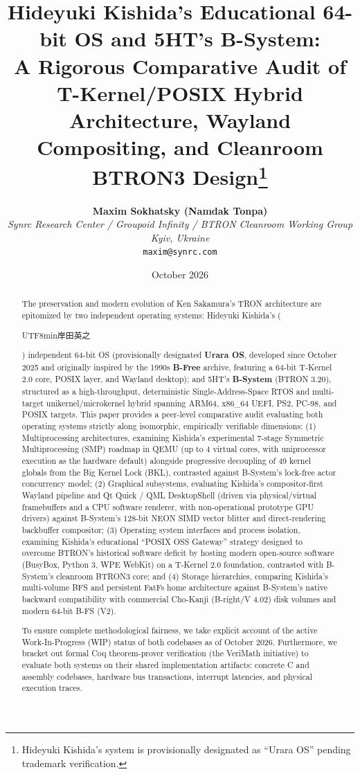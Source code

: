 \documentclass[10pt,journal,compsoc,twocolumn]{article}
\title{\LARGE \textbf{Hideyuki Kishida's Educational 64-bit OS and 5HT's B-System:\\A Rigorous Comparative Audit of T-Kernel/POSIX Hybrid Architecture, Wayland Compositing, and Cleanroom BTRON3 Design}\thanks{Hideyuki Kishida's system is provisionally designated as ``Urara OS'' pending trademark verification.}}
\author{
    \textbf{Maxim Sokhatsky (Namdak Tonpa)}\\[0.3em]
    \small \textit{Synrc Research Center / Groupoid Infinity / BTRON Cleanroom Working Group}\\
    \small \textit{Kyiv, Ukraine}\\
    \small \texttt{maxim@synrc.com}
}
\date{October 2026}
\newcommand{\ja}[1]{\begin{CJK*}{UTF8}{min}#1\end{CJK*}}
\begin{document}
\maketitle

\begin{abstract}
The preservation and modern evolution of Ken Sakamura's TRON architecture are epitomized by two independent operating systems: Hideyuki Kishida's (\ja{岸田英之}) independent 64-bit OS (provisionally designated \textbf{Urara OS}, developed since October 2025 and originally inspired by the 1990s \textbf{B-Free} archive, featuring a 64-bit T-Kernel 2.0 core, POSIX layer, and Wayland desktop); and 5HT's \textbf{B-System} (BTRON 3.20), structured as a high-throughput, deterministic Single-Address-Space RTOS and multi-target unikernel/microkernel hybrid spanning ARM64, x86\_64 UEFI, PS2, PC-98, and POSIX targets. This paper provides a peer-level comparative audit evaluating both operating systems strictly along isomorphic, empirically verifiable dimensions: (1) Multiprocessing architectures, examining Kishida's experimental 7-stage Symmetric Multiprocessing (SMP) roadmap in QEMU (up to 4 virtual cores, with uniprocessor execution as the hardware default) alongside progressive decoupling of 49 kernel globals from the Big Kernel Lock (BKL), contrasted against B-System's lock-free actor concurrency model; (2) Graphical subsystems, evaluating Kishida's compositor-first Wayland pipeline and Qt Quick / QML DesktopShell (driven via physical/virtual framebuffers and a CPU software renderer, with non-operational prototype GPU drivers) against B-System's 128-bit NEON SIMD vector blitter and direct-rendering backbuffer compositor; (3) Operating system interfaces and process isolation, examining Kishida's educational ``POSIX OSS Gateway'' strategy designed to overcome BTRON's historical software deficit by hosting modern open-source software (BusyBox, Python 3, WPE WebKit) on a T-Kernel 2.0 foundation, contrasted with B-System's cleanroom BTRON3 core; and (4) Storage hierarchies, comparing Kishida's multi-volume BFS and persistent FatFs home architecture against B-System's native backward compatibility with commercial Cho-Kanji (B-right/V 4.02) disk volumes and modern 64-bit B-FS (V2).

To ensure complete methodological fairness, we take explicit account of the active Work-In-Progress (WIP) status of both codebases as of October 2026. Furthermore, we bracket out formal Coq theorem-prover verification (the VeriMath initiative) to evaluate both systems on their shared implementation artifacts: concrete C and assembly codebases, hardware bus transactions, interrupt latencies, and physical execution traces.


\end{abstract}
\end{document}
